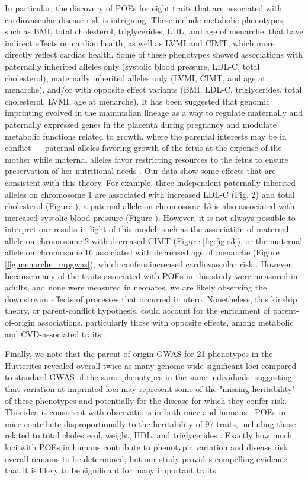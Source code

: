  In particular, the discovery of POEs for eight traits that are associated with cardiovascular disease risk is intriguing. These include metabolic phenotypes, such as BMI, total cholesterol, triglycerides, LDL, and age of menarche, that have indirect effects on cardiac health, as well as LVMI and CIMT, which more directly reflect cardiac health. Some of these phenotypes showed associations with paternally inherited alleles only (systolic blood pressure, LDL-C, total cholesterol), maternally inherited alleles only (LVMI, CIMT, and age at menarche), and/or with opposite effect variants (BMI, LDL-C, triglycerides, total cholesterol, LVMI, age at menarche). It has been suggested that genomic imprinting evolved in the mammalian lineage as a way to regulate maternally and paternally expressed genes in the placenta during pregnancy and modulate metabolic functions related to growth, where the parental interests may be in conflict — paternal alleles favoring growth of the fetus at the expense of the mother while maternal alleles favor restricting resources to the fetus to ensure preservation of her nutritional needs \cite{Haig:2000if,Barlow:2014dv,Patten:2016cb}. Our data show some effects that are consistent with this theory. For example, three independent paternally inherited alleles on chromosome 1 are associated with increased LDL-C (Fig. 2) and total cholesterol (Figure \label{fig:fig-s7}); a paternal allele on chromosome 13 is also associated with increased systolic blood pressure (Figure \label{fig:fig-s6}). However, it is not always possible to interpret our results in light of this model, such as the association of maternal allele on chromosome 2 with decreased CIMT (Figure \ref{fig:fig-s3}), or the maternal allele on chromosome 16 associated with decreased age of menarche (Figure  \ref{fig:menarche_mpgwas}), which confers increased cardiovascular risk \cite{Canoy:2015ha}. However, because many of the traits associated with POEs in this study were measured in adults, and none were measured in neonates, we are likely observing the downstream effects of processes that occurred in utero. Nonetheless, this kinship theory, or parent-conflict hypothesis, could account for the enrichment of parent-of-origin associations, particularly those with opposite effects, among metabolic and CVD-associated traits \cite{Peters2014}.
 
 Finally, we note that the parent-of-origin GWAS for 21 phenotypes in the Hutterites revealed overall twice as many genome-wide significant loci compared to standard GWAS of the same phenotypes in the same individuals, suggesting that variation at imprinted loci may represent some of the "missing heritability" of these phenotypes and potentially for the disease for which they confer risk. This idea is consistent with observations in both mice and humans \cite{Laurin:2017jv}. POEs in mice contribute disproportionally to the heritability of 97 traits, including those related to total cholesterol, weight, HDL, and triglycerides \cite{Mott2014}. Exactly how much loci with POEs in humans contribute to phenotypic variation and disease risk overall remains to be determined, but our study provides compelling evidence that it is likely to be significant for many important traits.


